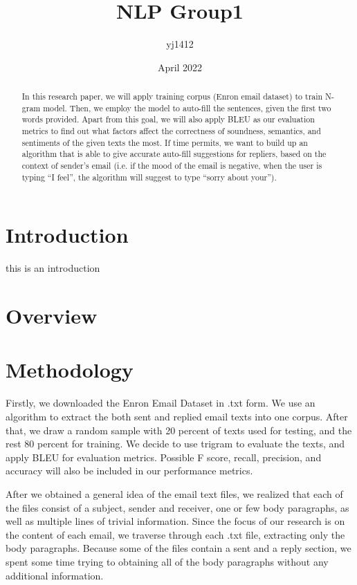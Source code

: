 \documentclass{article}
\title{NLP Group1}
\author{yj1412 }
\date{April 2022}
\begin{document}
\begin{multicols}{2}
\begin{abstract}

In this research paper, we will apply training corpus (Enron email dataset) to train N-gram model. Then, we employ the model to auto-fill the sentences, given the first two words provided. Apart from this goal, we will also apply BLEU as our evaluation metrics to find out what factors affect the correctness of soundness, semantics, and sentiments of the given texts the most. If time permits, we want to build up an algorithm that is able to give accurate auto-fill suggestions for repliers, based on the context of sender’s email (i.e. if the mood of the email is negative, when the user is typing “I feel”, the algorithm will suggest to type “sorry about your”).

   
\end{abstract}


\section{Introduction}
this is an introduction
\section{Overview}

\section{Methodology}
Firstly, we downloaded the Enron Email Dataset in .txt form. We use an algorithm to extract the both sent and replied email texts into one corpus. After that, we draw a random sample with 20 percent of texts used for testing, and the rest 80 percent for training. We decide to use trigram to evaluate the texts, and apply BLEU for evaluation metrics. Possible F score, recall, precision, and accuracy will also be included in our performance metrics.

After we obtained a general idea of the email text files, we realized that each of the files consist of a subject, sender and receiver, one or few body paragraphs, as well as multiple lines of trivial information. Since the focus of our research is on the content of each email, we traverse through each .txt file, extracting only the body paragraphs. Because some of the files contain a sent and a reply section, we spent some time trying to obtaining all of the body paragraphs without any additional information.


\end{multicols}
\end{document}
